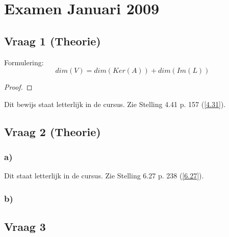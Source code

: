 \documentclass[lineaire_algebra_oplossingen.tex]{subfiles}
\begin{document}
\section{Examen Januari 2009}
\subsection{Vraag 1 (Theorie)}
Formulering:
\[
dim(V) = dim(Ker(A)) + dim(Im(L))
\]
\begin{proof}
\end{proof}
Dit bewijs staat letterlijk in de cursus. Zie Stelling 4.41 p. 157 (\ref{4.31}).

\subsection{Vraag 2 (Theorie)}
\subsubsection*{a)}
Dit staat letterlijk in de cursus. Zie Stelling 6.27 p. 238 (\ref{6.27}).

\subsubsection*{b)}

\subsection{Vraag 3}
\end{document}
